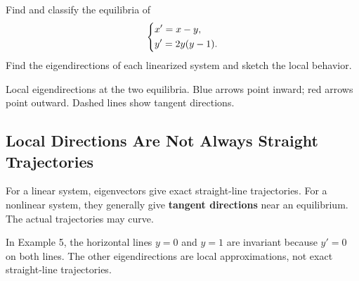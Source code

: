 \documentclass[10pt,letterpaper]{article}
\begin{document}
\begin{example}[5]{
Find and classify the equilibria of
\[
\begin{dcases}
x'=x-y,\\
y'=2y(y-1).
\end{dcases}
\]
Find the eigendirections of each linearized system
and sketch the local behavior.
}
\begin{center}

\small
Local eigendirections at the two equilibria.
Blue arrows point inward; red arrows point outward.
Dashed lines show tangent directions.
\end{center}
\end{example}

\subsection{Local Directions Are Not Always Straight Trajectories}

For a linear system, eigenvectors give exact
straight-line trajectories. For a nonlinear system,
they generally give \textbf{tangent directions}
near an equilibrium. The actual trajectories may curve.

In Example 5, the horizontal lines $y=0$ and $y=1$
are invariant because $y'=0$ on both lines.
The other eigendirections are local approximations,
not exact straight-line trajectories.
\end{document}
